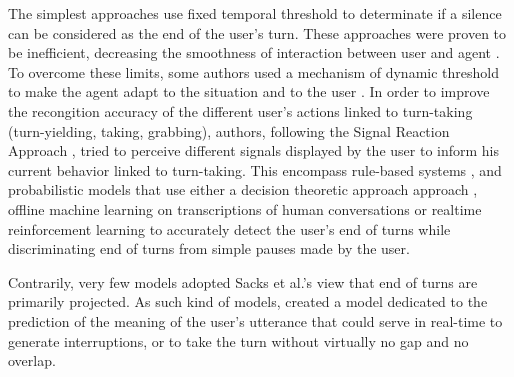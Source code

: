 The simplest approaches use fixed temporal threshold to determinate if a silence can be considered as the end of the user's turn. These approaches were proven to be inefficient, decreasing the
smoothness of interaction between user and agent \citep{ward_root_2005}. To
overcome these limits, some authors used a mechanism
of dynamic threshold to make the agent adapt to the
situation and to the user \citep{bohus_decisions_2011,witt_modeling_2014}. In order to improve the recongition accuracy of the different user's actions linked to turn-taking (turn-yielding, taking, grabbing), authors, following the Signal Reaction Approach \citep{duncan_signals_1972}, tried to perceive different signals displayed by the user to inform his current behavior linked to turn-taking.   
This encompass rule-based systems \citep{cassell_embodiment_1999,thorisson_natural_2002}, and probabilistic
models that use either a decision theoretic approach
approach \citep{bohus_decisions_2011,raux_optimizing_2012}, offline machine learning on transcriptions of human conversations \citep{schlangen_from_2006,huang_multimodal_2011} or realtime reinforcement learning \citep{jonsdottir_distributed_2013} to accurately detect the user's end of turns while discriminating end of turns from simple pauses made by the user. 

Contrarily, very few models adopted Sacks et al.'s view that end of turns are primarily projected. As such kind of models, \citep{de_vault_incremental_2011} created a model dedicated to the prediction of the meaning of the user's utterance that could serve in real-time to generate interruptions, or to take the turn without virtually no gap and no overlap.

